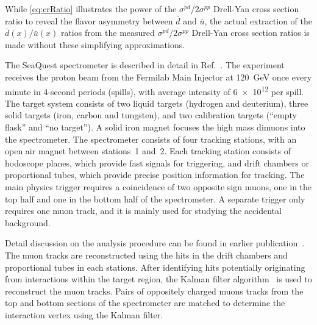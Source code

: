 \documentclass[reprint,aps,unsortedaddress,superscriptaddress,prl,floatfix,showpacs,linenumbers]{revtex4-2}
\begin{document}
While \cref{eq:crRatio} illustrates the power of the $\sigma^{pd}/2\sigma^{pp}$ Drell-Yan cross section
ratio to reveal the flavor asymmetry between $\bar{d}$ and $\bar{u}$,
the actual extraction of the $\bar{d}\left(x\right) / \bar{u}\left(x\right)$
ratios from the measured $\sigma^{pd}/ 2 \sigma^{pp}$ Drell-Yan cross
section ratios is made without these simplifying approximations.

The SeaQuest spectrometer is  described in detail in Ref.~\cite{aidala2019}.
The experiment receives the  proton beam from the Fermilab Main
Injector at \SI{120}{\GeV}
once every minute in 4-second periods (spills), with average intensity
of \num{6e12} per spill.
The target system consists of two liquid targets (hydrogen and deuterium),
three solid targets (iron, carbon and tungsten), and two calibration
targets (``empty flask'' and ``no target'').
A solid iron magnet focuses the high mass dimuons into the spectrometer.
The spectrometer consists of four tracking stations, with an open
air magnet between stations~1 and~2.
Each tracking station consists of hodoscope planes, which
provide fast signals for triggering,
and drift chambers or proportional tubes, which provide precise
position information for tracking.
The main physics trigger requires a coincidence of two opposite sign muons,
one in the top half and one in the bottom half of the spectrometer.
A separate trigger only requires one muon track, and it is mainly used
for studying the accidental background.

Detail discussion on the analysis procedure can be found in earlier publication~\cite{dove2021,dove2023}.
The muon tracks are reconstructed using the hits in the drift chambers and proportional tubes in each stations.
After identifying hits potentially originating from interactions within the target region,
the Kalman filter algorithm~\cite{kalman1960} is used to reconstruct the muon tracks.
Pairs of oppositely charged muons tracks from the top and bottom sections of the spectrometer are
matched to determine the interaction vertex using the Kalman filter.
\end{document}
